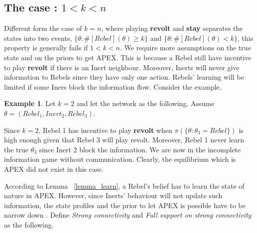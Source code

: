 \documentclass[12pt,letter]{article}
\theoremstyle{definition}
\newtheorem{example}{Example}[section]
\theoremstyle{remark}
\theoremstyle{claim}
\begin{document}
\subsection{The case : $1<k<n$}

Different form the case of $k=n$, where playing \textbf{revolt} and \textbf{stay} separates the states into two events, $\{\theta: \#[Rebel](\theta)\geq k\}$ and $\{\theta: \#[Rebel](\theta)< k\}$,  this property is generally fails if  $1<k<n$. We require more assumptions on the true state and on the priors to get APEX. This is because a Rebel still have incentive to play \textbf{revolt} if there is an Inert neighbour. Moreover, Inerts will never give information to Rebels since they have only one action. Rebels' learning will be limited if some Iners block the information flow. Consider the example. 

\begin{example}\label{ex_strong_connectivity}
Let $k=2$ and let the network as the following. Assume $\theta=(Rebel_1,Inert_2,Rebel_3)$.

\begin{center}
\end{center}

Since $k=2$, Rebel 1 has incentive to play \textbf{revolt} when $\pi(\{\theta:\theta_3=Rebel\})$ is high enough given that Rebel 3 will play revolt. Moreover, Rebel 1 never learn the true $\theta_3$ since Inert 2 block the information. We are now in the incomplete information game without communication. Clearly, the equilibrium which is APEX did not exist in this case.

\end{example}

According to Lemma ~\ref{lemma_learn}, a Rebel's belief has to learn the state of nature in APEX. However, since Inerts' behaviour will not update such information, the state profiles and the prior to let APEX is possible have to be narrow down . Define \textit{Strong connectivity} and \textit{Full support on strong connectivity} as the following.
\end{document}
